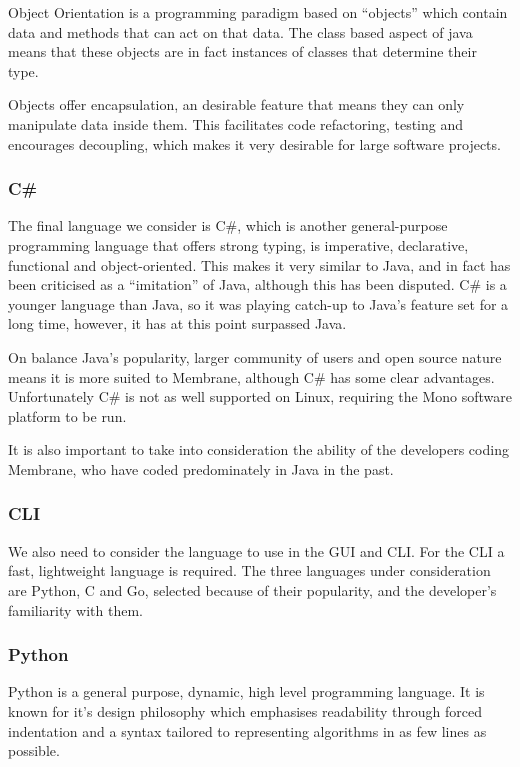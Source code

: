 \documentclass[11pt, a4paper, twoside]{report}
\begin{document}
Object Orientation is a programming paradigm based on ``objects'' which contain data and methods that can act on that data. The class based aspect of java means that these objects are in fact instances of classes that determine their type. \citep{kindler2011object}

Objects offer encapsulation, an desirable feature that means they can only manipulate data inside them. This facilitates code refactoring, testing and encourages decoupling, which makes it very desirable for large software projects.

\subsubsection{C\#}

The final language we consider is C\#, which is another general-purpose programming language that offers strong typing, is imperative, declarative, functional and object-oriented. This makes it very similar to Java, and in fact has been criticised as a ``imitation'' of Java, although this has been disputed. C\# is a younger language than Java, so it was playing catch-up to Java's feature set for a long time, however, it has at this point surpassed Java. \citep{kreft2017afterjava}

On balance Java's popularity, larger community of users and open source nature means it is more suited to Membrane, although C\# has some clear advantages. Unfortunately C\# is not as well supported on Linux, requiring the Mono software platform to be run.

It is also important to take into consideration the ability of the developers coding Membrane, who have coded predominately in Java in the past.

\subsubsection{CLI}

We also need to consider the language to use in the GUI and CLI. For the CLI a fast, lightweight language is required. The three languages under consideration are Python, C and Go, selected because of their popularity, and the developer's familiarity with them.

\subsubsection{Python}

Python is a general purpose, dynamic, high level programming language. It is known for it's design philosophy which emphasises readability through forced indentation and a syntax tailored to representing algorithms in as few lines as possible.
\end{document}
